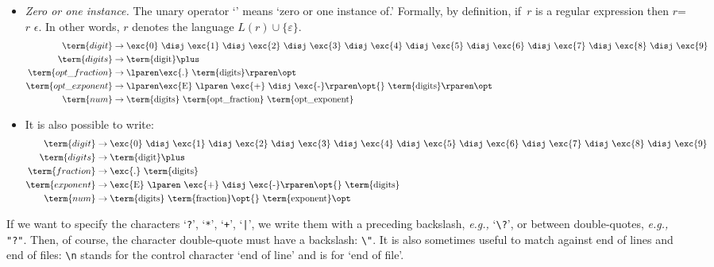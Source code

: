 \begin{itemize}

  \item \emph{Zero or one instance.} The unary operator `\opt{}' means
    `zero or one instance of.' Formally, by definition, if~\(r\) is a
    regular expression then \(r\)\opt = \(r\) \disj \(\epsilon\). In
    other words, \lparen\(r\)\rparen\opt{} denotes the language \(L(r)
    \cup \{\varepsilon\}\).
\begin{align*}
\term{digit} & \rightarrow \text{\exc{0} \disj \exc{1} \disj \exc{2}
  \disj \exc{3} \disj \exc{4} \disj \exc{5} \disj \exc{6} \disj
  \exc{7} \disj \exc{8} \disj \exc{9}}\\
\term{digits} & \rightarrow \text{\term{digit}\plus}\\
\term{opt\_fraction} & \rightarrow \text{\lparen\exc{.}
  \term{digits}\rparen\opt}\\
\term{opt\_exponent} & \rightarrow \text{\lparen\exc{E} \lparen
  \exc{+} \disj \exc{-}\rparen\opt{} \term{digits}\rparen\opt}\\
\term{num} & \rightarrow \text{\term{digits} \term{opt\_fraction}
  \term{opt\_exponent}}
\end{align*}

 \item It is also possible to write:
\begin{align*}
\term{digit} & \rightarrow \text{\exc{0} \disj \exc{1} \disj \exc{2}
  \disj \exc{3} \disj \exc{4} \disj \exc{5} \disj \exc{6} \disj
  \exc{7} \disj \exc{8} \disj \exc{9}}\\
\term{digits} & \rightarrow \text{\term{digit}\plus}\\
\term{fraction} & \rightarrow \text{\exc{.} \term{digits}}\\
\term{exponent} & \rightarrow \text{\exc{E} \lparen \exc{+} \disj
  \exc{-}\rparen\opt{} \term{digits}}\\
\term{num} & \rightarrow \text{\term{digits} \term{fraction}\opt{}
  \term{exponent}\opt}
\end{align*}

\end{itemize}
If we want to specify the characters `\texttt{?}', `\texttt{*}',
`\texttt{+}', `\texttt{|}', we write them with a preceding backslash,
\emph{e.g.,} `\verb+\?+', or between double-quotes, \emph{e.g.,}
\verb+"?"+. Then, of course, the character double-quote must have a
backslash: \verb+\"+. It is also sometimes useful to match against end
of lines and end of files: \verb+\n+ stands for the control character
`end of line' and \term{\$} is for `end of file'.

